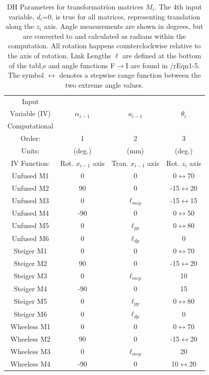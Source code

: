 \documentclass[letterpaper, 10 pt, conference]{ieeeconf}  %
\begin{document}
\begin{table}
	\centering
	\caption{DH Parameters for transformatrion matrices $M_i$. The 4th input variable, $d_i$=0, is true for all matrices, representing translation along the $z_i$ axis. Angle measurements are shown in degrees, but are converted to and calculated as radians within the computation. All rotation happens counterclockwise relative to the axis of rotation. Link Lengths $\ell$ are defined at the bottom of the tabl,e and angle functions F$\rightarrow$I are found in /rEqn{1-5}.  The symbol $\leftrightarrow$ denotes a stepwise range function between the two extreme angle values.}\label{dhtable}
	\begin{tabular}{c|c|c|c}
	Input & & & \\
		Variable (IV) & $\alpha_{i-1}$ & $a_{i-1}$ & $\theta_i$ \\
		\hline
		Computational & & & \\
		 Order: & 1 & 2 & 3 \\
		Units: & (deg.) & (mm) & (deg.) \\
		IV Function: & Rot. $x_{i-1}$ axis  & Tran. $x_{i-1}$ axis & Rot. $z_i$ axis \\
		\hline
		Unfused M1 & 0 & 0 & 0$\leftrightarrow$70\\
		Unfused M2 & 90 & 0 & -15$\leftrightarrow$20 \\
		Unfused M3 & 0 & $\ell_{mcp}$ & -15$\leftrightarrow$15\\
		Unfused M4 & -90 & 0 & 0$\leftrightarrow$50 \\
		Unfused M5 & 0 & $\ell_{pp}$ & 0$\leftrightarrow$80 \\
		Unfused M6 & 0 & $\ell_{dp}$ & 0 \\
		\hline
		Steiger M1 & 0 & 0 & 0$\leftrightarrow$70 \\
		Steiger M2 & 90 & 0 & -15$\leftrightarrow$20 \\
		Steiger M3 & 0 & $\ell_{mcp}$ & 10 \\
		Steiger M4 & -90 & 0 & 15 \\
		Steiger M5 & 0 & $\ell_{pp}$ & 0$\leftrightarrow$80 \\
		Steiger M6 & 0 & $\ell_{dp}$ & 0 \\
		\hline
		Wheeless M1 & 0 & 0 & 0$\leftrightarrow$70 \\
		Wheeless M2 & 90 & 0 & -15$\leftrightarrow$20 \\
		Wheeless M3 & 0 & $\ell_{mcp}$ & 20 \\
		Wheeless M4 & -90 & 0 & 10$\leftrightarrow$20 \\

\end{tabular}
\end{table}
\end{document}
